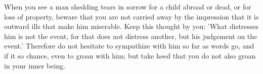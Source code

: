 When you see a man shedding tears in  sorrow for a child abroad or dead, or for
loss of property, beware  that you are not carried away  by the impression that
it is  outward ills that  make him miserable. Keep  this thought by  you: 'What
distresses him is  not the event, for  that does not distress  another, but his
judgement on  the event.' Therefore do  not hesitate to sympathize  with him so
far as  words go, and if  it so chance, even  to groan with him;  but take heed
that you do not also groan in your inner being.
